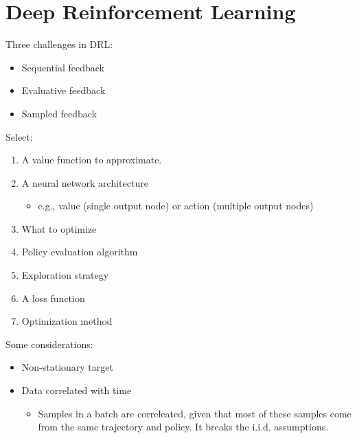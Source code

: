 \chapter{Deep Reinforcement Learning}

Three challenges in DRL:
\begin{itemize}
	\item Sequential feedback
	\item Evaluative feedback
	\item Sampled feedback
\end{itemize}

Select:
\begin{enumerate}
	\item A value function to approximate.
	\item A neural network architecture
		\begin{itemize}
			\item e.g., value (single output node) or action (multiple output nodes)
		\end{itemize}
	\item What to optimize
	\item Policy evaluation algorithm
	\item Exploration strategy
	\item A loss function
	\item Optimization method
\end{enumerate}

Some considerations:
\begin{itemize}
	\item Non-stationary target
	\item Data correlated with time
		\begin{itemize}
			\item Samples in a batch are correleated, given that most of these samples come from the same trajectory and policy. It breaks the i.i.d. assumptions. 
		\end{itemize}
\end{itemize}
